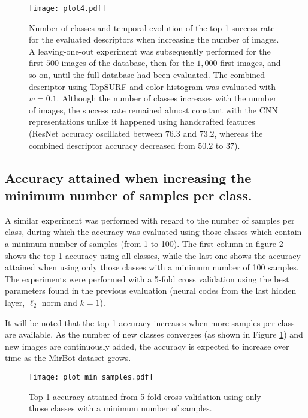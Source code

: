 \documentclass[final, twocolumn]{elsarticle}
\begin{document}
\begin{figure}
\center
\texttt{[image: plot4.pdf]}
\caption{\label{Plot4}Number of classes and temporal evolution of the top-1 success rate for the evaluated descriptors when increasing the number of images. A leaving-one-out experiment was subsequently performed for the first $500$ images of the database, then for the $1,000$ first images, and so on, until the full database had been evaluated. The combined descriptor using TopSURF and color histogram was evaluated with $w=0.1$. Although the number of classes increases with the number of images, the success rate remained almost constant with the CNN representations unlike it happened using handcrafted features (ResNet accuracy oscillated between $76.3$ and $73.2$, whereas the combined descriptor accuracy decreased from $50.2$ to $37$).}
\end{figure}


\subsection{Accuracy attained when increasing the minimum number of samples per class.}

A similar experiment was performed with regard to the number of samples per class, during which the accuracy was evaluated using those classes which contain a minimum number of samples (from 1 to 100). The first column in figure \ref{fig:plot_min_samples} shows the top-1 accuracy using all classes, while the last one shows the accuracy attained when using only those classes with a minimum number of 100 samples. The experiments were performed with a 5-fold cross validation using the best parameters found in the previous evaluation (neural codes from the last hidden layer, $\ell_2$ norm and $k=1$).

It will be noted that the top-1 accuracy increases when more samples per class are available. As the number of new classes converges (as shown in Figure \ref{Plot4}) and new images are continuously added, the accuracy is expected to increase over time as the MirBot dataset grows.

\begin{figure}
\center
\texttt{[image: plot\_min\_samples.pdf]}
\caption{\label{fig:plot_min_samples}Top-1 accuracy attained from 5-fold cross validation using only those classes with a minimum number of samples.}
\end{figure}
\end{document}
